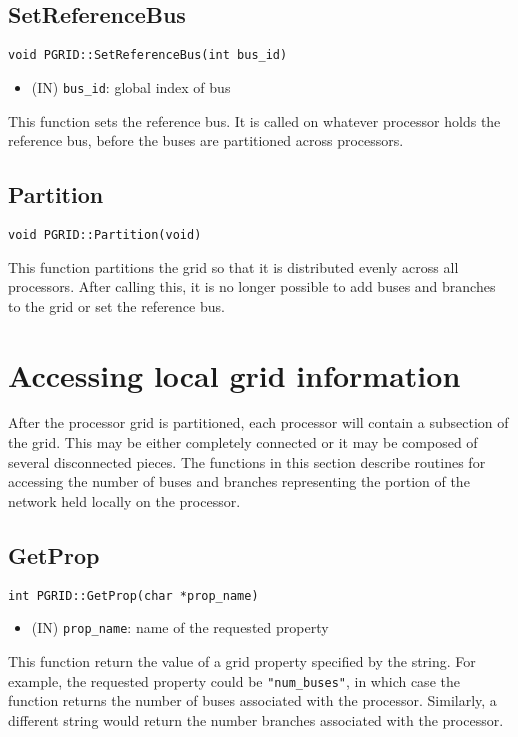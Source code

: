 \documentclass[12pt]{article}
\begin{document}
\subsection{SetReferenceBus}
\begin{verbatim}
void PGRID::SetReferenceBus(int bus_id)
\end{verbatim}
\begin{itemize}
\item (IN) \texttt{bus\_id}: global index of bus
\end{itemize}
This function sets the reference bus. It is called on whatever processor holds
the reference bus, before the buses are partitioned across processors.
\subsection{Partition}
\begin{verbatim}
void PGRID::Partition(void)
\end{verbatim}
This function partitions the grid so that it is distributed evenly across all
processors. After calling this, it is no longer possible to add buses and
branches to the grid or set the reference bus.

\section{Accessing local grid information}
After the processor grid is partitioned, each processor will contain a
subsection of the grid. This may be either completely connected or it may be
composed of several disconnected pieces. The functions in this section describe
routines for accessing the number of buses and branches representing the portion
of the network held locally on the processor.
\subsection{GetProp}
\begin{verbatim}
int PGRID::GetProp(char *prop_name)
\end{verbatim}
\begin{itemize}
\item (IN) \texttt{prop\_name}: name of the requested property
\end{itemize}
This function return the value of a grid property specified by the string. For
example, the requested property could be \texttt{"num\_buses"}, in which case
the function returns the number of buses associated with the processor.
Similarly, a different string would return the number branches associated with the
processor.
\end{document}
